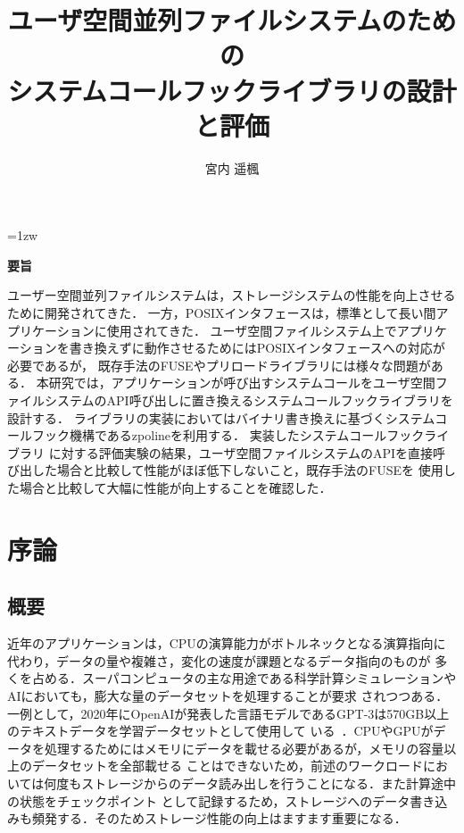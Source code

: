 \documentclass[a4paper，11pt]{jreport}
\title{ユーザ空間並列ファイルシステムのための\\システムコールフックライブラリの設計と評価}
\author{宮内 遥楓}
\begin{document}
\maketitle
\thispagestyle{empty}
\newpage

\thispagestyle{empty}
\vspace*{20pt plus 1fil}
\parindent=1zw
\noindent
\begin{center}
{\Large \bf 要旨}
\vspace{2cm}
\end{center}
ユーザー空間並列ファイルシステムは，ストレージシステムの性能を向上させるために開発されてきた． 
一方，POSIXインタフェースは，標準として長い間アプリケーションに使用されてきた．
ユーザ空間ファイルシステム上でアプリケーションを書き換えずに動作させるためにはPOSIXインタフェースへの対応が必要であるが，
既存手法のFUSEやプリロードライブラリには様々な問題がある．
本研究では，アプリケーションが呼び出すシステムコールをユーザ空間ファイルシステムのAPI呼び出しに置き換えるシステムコールフックライブラリを設計する．
ライブラリの実装においてはバイナリ書き換えに基づくシステムコールフック機構であるzpolineを利用する． 実装したシステムコールフックライブラリ
に対する評価実験の結果，ユーザ空間ファイルシステムのAPIを直接呼び出した場合と比較して性能がほぼ低下しないこと，既存手法のFUSEを
使用した場合と比較して大幅に性能が向上することを確認した．

\par
\vspace{0pt plus 1fil}
\newpage

\tableofcontents
\listoffigures

\pagebreak \setcounter{page}{1}

\chapter{序論}
\section{概要}
近年のアプリケーションは，CPUの演算能力がボトルネックとなる演算指向に代わり，データの量や複雑さ，変化の速度が課題となるデータ指向のものが
多くを占める．スーパコンピュータの主な用途である科学計算シミュレーションやAIにおいても，膨大な量のデータセットを処理することが要求
されつつある．一例として，2020年にOpenAIが発表した言語モデルであるGPT-3は570GB以上のテキストデータを学習データセットとして使用して
いる~\cite{3495883}．CPUやGPUがデータを処理するためにはメモリにデータを載せる必要があるが，メモリの容量以上のデータセットを全部載せる
ことはできないため，前述のワークロードにおいては何度もストレージからのデータ読み出しを行うことになる．また計算途中の状態をチェックポイント
として記録するため，ストレージへのデータ書き込みも頻発する．そのためストレージ性能の向上はますます重要になる．
\end{document}
